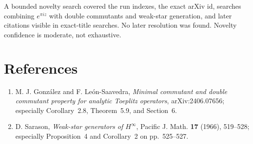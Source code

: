\documentclass[11pt]{article}
\begin{document}
A bounded novelty search covered the run indexes, the exact arXiv id,
searches combining $e^{\pi i z}$ with double commutants and weak-star
generation, and later citations visible in exact-title searches. No later
resolution was found. Novelty confidence is moderate, not exhaustive.

\section*{References}

\begin{enumerate}
\item M. J. Gonz\'alez and F. Le\'on-Saavedra,
\emph{Minimal commutant and double commutant property for analytic Toeplitz
operators}, arXiv:2406.07656; especially Corollary~2.8, Theorem~5.9, and
Section~6.
\item D. Sarason, \emph{Weak-star generators of $H^\infty$}, Pacific J.
Math. \textbf{17} (1966), 519--528; especially Proposition~4 and
Corollary~2 on pp.~525--527.
\end{enumerate}
\end{document}
